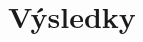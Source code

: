 \documentclass[xcolor=dvipsnames, compress, 12pt]{beamer}
\theoremstyle{definition}
\begin{document}


\section{Výsledky}



\end{document}
